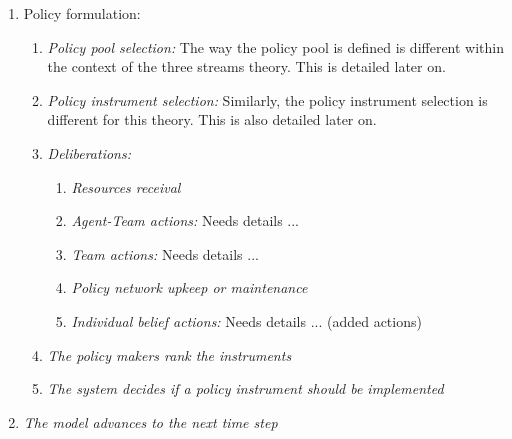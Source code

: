 \begin{enumerate}
\item Policy formulation:
	\begin{enumerate}
	\item \emph{Policy pool selection:} The way the policy pool is defined is different within the context of the three streams theory. This is detailed later on.
	\item \emph{Policy instrument selection:}  Similarly, the policy instrument selection is different for this theory. This is also detailed later on.
	\item \emph{Deliberations:}
		\begin{enumerate}
		\item \emph{Resources receival}
		\item \emph{Agent-Team actions:} Needs details ...
		\item \emph{Team actions:} Needs details ...
		\item \emph{Policy network upkeep or maintenance}
		\item \emph{Individual belief actions:}  Needs details ... (added actions)
		\end{enumerate}
	\item \emph{The policy makers rank the instruments}
	\item \emph{The system decides if a policy instrument should be implemented}
	\end{enumerate}
\item \emph{The model advances to the next time step}
\end{enumerate}



